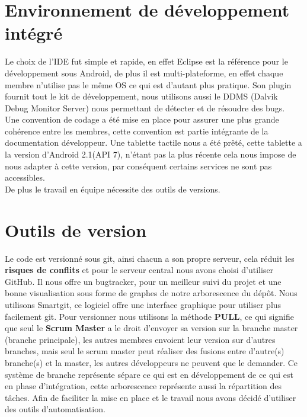 \section{Environnement de développement intégré}
Le choix de l'IDE fut simple et rapide, en effet Eclipse est la référence pour le développement sous Android, de plus il est multi-plateforme,
en effet chaque membre n'utilise pas le même OS ce qui est d'autant plus pratique.
Son plugin fournit tout le kit de développement, nous utilisons aussi le DDMS (Dalvik Debug Monitor Server) nous permettant de détecter et de résoudre
des bugs. \\
Une convention de codage a été mise en place pour assurer une plus grande cohérence entre les membres, cette convention est partie intégrante de la
documentation développeur.
Une tablette tactile nous a été prêté, cette tablette a la version d'Android 2.1(API 7), n'étant pas la plus récente cela nous impose de nous adapter à
cette version, par conséquent certains services ne sont pas accessibles. \\
De plus le travail en équipe nécessite des outils de versions.

\section{Outils de version}
Le code est versionné sous git, ainsi chacun a son propre serveur, cela réduit les \textbf{risques de conflits} et pour le serveur central nous avons choisi 
d'utiliser GitHub. Il nous offre un bugtracker, pour un meilleur suivi du projet et une bonne visualisation sous forme de graphes de notre arborescence
du dépôt. Nous utilisons Smartgit, ce logiciel offre une interface graphique pour utiliser plus facilement git.
Pour versionner nous utilisons la méthode \textbf{PULL}, ce qui signifie que seul le \textbf{Scrum Master} a le droit d'envoyer sa version sur la branche
master (branche principale), les autres membres envoient leur version sur d'autres branches, mais seul le scrum master peut réaliser des fusions entre 
d'autre(s) branche(s) et la master, les autres développeurs ne peuvent que le demander. Ce système de branche représente sépare ce qui est en développement 
de ce qui est en phase d'intégration, cette arborescence représente aussi la répartition des tâches.
Afin de faciliter la mise en place et le travail nous avons décidé d'utiliser des outils d'automatisation.


